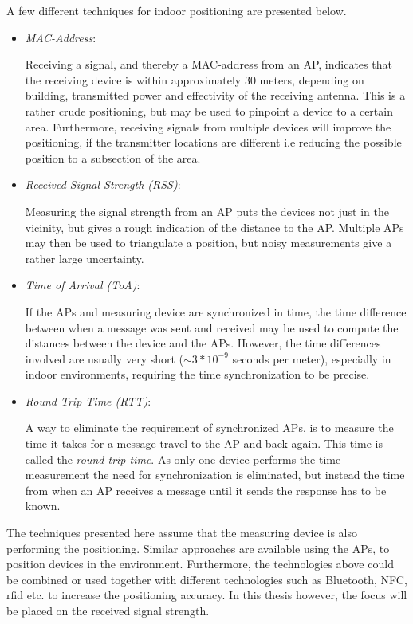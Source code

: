 \documentclass{LTHthesis}
\begin{document}
A few different techniques for indoor positioning are presented below.
%
\begin{itemize}
\item \emph{MAC-Address}:  

Receiving a signal, and thereby a MAC-address from an AP, indicates that the receiving device is within approximately $30$ meters, depending on building, transmitted power and effectivity of the receiving antenna. This is a rather crude positioning, but may be used to pinpoint a device to a certain area. Furthermore, receiving signals from multiple devices will improve the positioning, if the transmitter locations are different i.e reducing the possible position to a subsection of the area. 
%
\item \emph{Received Signal Strength (RSS)}:

Measuring the signal strength from an AP puts the devices not just in the vicinity, but gives a rough indication of the distance to the AP. Multiple APs may then be used to triangulate a position, but noisy measurements give a rather large uncertainty. 
%
\item \emph{Time of Arrival (ToA)}:

If the APs and measuring device are synchronized in time, the time difference between when a message was sent and received may be used to compute the distances between the device and the APs. However, the time differences involved are usually very short ($\sim 3*10^{-9}$ seconds per meter), especially in indoor environments, requiring the time synchronization to be precise.  
%
\item \emph{Round Trip Time (RTT)}: 

A way to eliminate the requirement of synchronized APs, is to measure the time it takes for a message travel to the AP and back again. This time is called the \emph{round trip time}. As only one device performs the time measurement the need for synchronization is eliminated, but instead the time from when an AP receives a message until it sends the response has to be known.
%
\end{itemize}
%
The techniques presented here assume that the measuring device is also performing the positioning. Similar approaches are available using the APs, to position devices in the environment. Furthermore, the technologies above could be combined or used together with different technologies such as Bluetooth, NFC, rfid etc. to increase the positioning accuracy. 
In this thesis however, the focus will be placed on the received signal strength.
%
\end{document}
